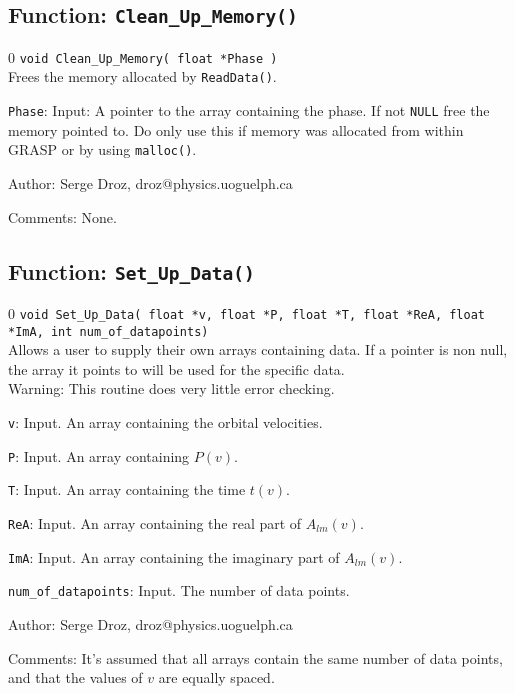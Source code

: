 \subsection{Function: {\tt Clean\_Up\_Memory()}}
\setcounter{equation}0
{\tt void Clean\_Up\_Memory( float *Phase )}\\
Frees the memory allocated by {\tt ReadData()}. 

\begin{description}
\item{{\tt Phase}}: Input: A pointer to the array containing the phase.
                       If not {\tt NULL} free the memory pointed to. Do only use this
					   if memory was allocated from within GRASP or by using
					   {\tt malloc()}. 
\end{description}
\begin{description}
\item{Author:} Serge Droz, droz@physics.uoguelph.ca
\item{Comments:} None.
\end{description}
\clearpage

%
%

\subsection{Function: {\tt Set\_Up\_Data()}}
\setcounter{equation}0
{\tt void Set\_Up\_Data( float *v, float *P, float *T, float *ReA, float *ImA,
                  int num\_of\_datapoints)  } \\
Allows a user to supply their own arrays containing data. If a pointer
is non null, the array it points to will be used for the specific data.\\
Warning: This routine does very little error checking.

\begin{description}
\item{{\tt v}}: Input. An array containing the orbital velocities. 
\item{{\tt P}}: Input. An array containing $P(v)$. 
\item{{\tt T}}: Input. An array containing the time $t(v)$. 
\item{{\tt ReA}}: Input. An array containing the real part of $A_{lm}(v)$.
\item{{\tt ImA}}: Input. An array containing the imaginary part of $A_{lm}(v)$.
\item{{\tt num\_of\_datapoints}}: Input. The number of data points.
\end{description}
\begin{description}
\item{Author:} Serge Droz, droz@physics.uoguelph.ca
\item{Comments:} It's assumed that all arrays contain the same number of
data points, and that the values of $v$ are equally spaced.
\end{description}
\clearpage

